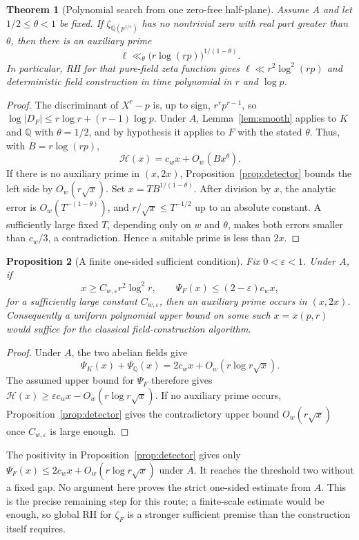 \documentclass[11pt]{article}
\newcommand{\Q}{\mathbb Q}
\newtheorem{theorem}{Theorem}[section]
\newtheorem{proposition}[theorem]{Proposition}
\theoremstyle{definition}
\theoremstyle{remark}
\begin{document}
\begin{theorem}[Polynomial search from one zero-free half-plane]
\label{thm:fixedstrip}
Assume $A$ and let $1/2\leq\theta<1$ be fixed.
If $\zeta_{\Q(p^{1/r})}$ has no nontrivial zero with real
part greater than $\theta$, then there is an auxiliary prime
\[
 \ell\ll_\theta \bigl(r\log(rp)\bigr)^{1/(1-\theta)}.
\]
In particular, RH for that pure-field zeta function gives
$\ell\ll r^2\log^2(rp)$ and deterministic field construction
in time polynomial in $r$ and $\log p$.
\end{theorem}
\begin{proof}
The discriminant of $X^r-p$ is, up to sign,
$r^r p^{r-1}$, so
$\log|D_F|\leq r\log r+(r-1)\log p$.
Under $A$, Lemma~\ref{lem:smooth} applies to $K$ and $\Q$
with $\theta=1/2$, and by hypothesis it applies to $F$
with the stated $\theta$.  Thus, with $B=r\log(rp)$,
\[
 \mathcal H(x)=c_wx+O_w(Bx^\theta).
\]
If there is no auxiliary prime in $(x,2x)$,
Proposition~\ref{prop:detector} bounds the left side by
$O_w(r\sqrt x)$.  Set $x=T B^{1/(1-\theta)}$.
After division by $x$, the analytic error is
$O_w(T^{-(1-\theta)})$, and $r/\sqrt x\leq T^{-1/2}$
up to an absolute constant.  A sufficiently large fixed
$T$, depending only on $w$ and $\theta$, makes both
errors smaller than $c_w/3$, a contradiction.
Hence a suitable prime is less than $2x$.
\end{proof}

\begin{proposition}[A finite one-sided sufficient condition]
\label{prop:window}
Fix $0<\varepsilon<1$.  Under $A$, if
\[
 x\geq C_{w,\varepsilon}r^2\log^2r,
 \qquad \Psi_F(x)\leq(2-\varepsilon)c_wx,
\]
for a sufficiently large constant $C_{w,\varepsilon}$,
then an auxiliary prime occurs in $(x,2x)$.
Consequently a uniform polynomial upper bound on some
such $x=x(p,r)$ would suffice for the classical
field-construction algorithm.
\end{proposition}
\begin{proof}
Under $A$, the two abelian fields give
\[
 \Psi_K(x)+\Psi_{\Q}(x)
       =2c_wx+O_w(r\log r\sqrt x).
\]
The assumed upper bound for $\Psi_F$ therefore gives
$\mathcal H(x)\geq\varepsilon c_wx
-O_w(r\log r\sqrt x)$.
If no auxiliary prime occurs, Proposition~\ref{prop:detector}
gives the contradictory upper bound $O_w(r\sqrt x)$
once $C_{w,\varepsilon}$ is large enough.
\end{proof}

The positivity in Proposition~\ref{prop:detector} gives only
$\Psi_F(x)\leq2c_wx+O_w(r\log r\sqrt x)$ under $A$.
It reaches the threshold two without a fixed gap.
No argument here proves the strict one-sided estimate from
$A$.  This is the precise remaining step for this route;
a finite-scale estimate would be enough, so global RH
for $\zeta_F$ is a stronger sufficient premise than the
construction itself requires.
\end{document}

